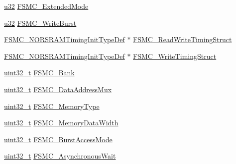 \begin{DoxyCompactItemize}
\item 
\hyperlink{agilefox_2library_2inc_2stm32f10x__type_8h_a2caf5cd7bcdbe1eefa727f44ffb10bac}{u32} \hyperlink{struct_f_s_m_c___n_o_r_s_r_a_m_init_type_def_a1349af33017420a56fe74fd8e04714b6}{F\+S\+M\+C\+\_\+\+Extended\+Mode}
\item 
\hyperlink{agilefox_2library_2inc_2stm32f10x__type_8h_a2caf5cd7bcdbe1eefa727f44ffb10bac}{u32} \hyperlink{struct_f_s_m_c___n_o_r_s_r_a_m_init_type_def_a52964222ffe30f48ad128975ae750aed}{F\+S\+M\+C\+\_\+\+Write\+Burst}
\item 
\hyperlink{struct_f_s_m_c___n_o_r_s_r_a_m_timing_init_type_def}{F\+S\+M\+C\+\_\+\+N\+O\+R\+S\+R\+A\+M\+Timing\+Init\+Type\+Def} $\ast$ \hyperlink{struct_f_s_m_c___n_o_r_s_r_a_m_init_type_def_a89727833f179b72ede3f11396c01732c}{F\+S\+M\+C\+\_\+\+Read\+Write\+Timing\+Struct}
\item 
\hyperlink{struct_f_s_m_c___n_o_r_s_r_a_m_timing_init_type_def}{F\+S\+M\+C\+\_\+\+N\+O\+R\+S\+R\+A\+M\+Timing\+Init\+Type\+Def} $\ast$ \hyperlink{struct_f_s_m_c___n_o_r_s_r_a_m_init_type_def_a4ca9ddc4f0dbad8192d672e78bf3be3d}{F\+S\+M\+C\+\_\+\+Write\+Timing\+Struct}
\item 
\hyperlink{_p_e___types_8h_a33594304e786b158f3fb30289278f5af}{uint32\+\_\+t} \hyperlink{struct_f_s_m_c___n_o_r_s_r_a_m_init_type_def_a7fcd864461cf0d1cf83b62fa2b4d3f86}{F\+S\+M\+C\+\_\+\+Bank}
\item 
\hyperlink{_p_e___types_8h_a33594304e786b158f3fb30289278f5af}{uint32\+\_\+t} \hyperlink{struct_f_s_m_c___n_o_r_s_r_a_m_init_type_def_af4ff95085d3bb39e34c2f88ca3140ce5}{F\+S\+M\+C\+\_\+\+Data\+Address\+Mux}
\item 
\hyperlink{_p_e___types_8h_a33594304e786b158f3fb30289278f5af}{uint32\+\_\+t} \hyperlink{struct_f_s_m_c___n_o_r_s_r_a_m_init_type_def_a979ad605c6a63923e060576ee01e888d}{F\+S\+M\+C\+\_\+\+Memory\+Type}
\item 
\hyperlink{_p_e___types_8h_a33594304e786b158f3fb30289278f5af}{uint32\+\_\+t} \hyperlink{struct_f_s_m_c___n_o_r_s_r_a_m_init_type_def_a1791c771ff86f5dc5422040409517e9d}{F\+S\+M\+C\+\_\+\+Memory\+Data\+Width}
\item 
\hyperlink{_p_e___types_8h_a33594304e786b158f3fb30289278f5af}{uint32\+\_\+t} \hyperlink{struct_f_s_m_c___n_o_r_s_r_a_m_init_type_def_aec0bfff5c934c251c21450a50f5bdb79}{F\+S\+M\+C\+\_\+\+Burst\+Access\+Mode}
\item 
\hyperlink{_p_e___types_8h_a33594304e786b158f3fb30289278f5af}{uint32\+\_\+t} \hyperlink{struct_f_s_m_c___n_o_r_s_r_a_m_init_type_def_ac350cc34377fe3d5f882a6801bab1ac9}{F\+S\+M\+C\+\_\+\+Asynchronous\+Wait}

\end{DoxyCompactItemize}
